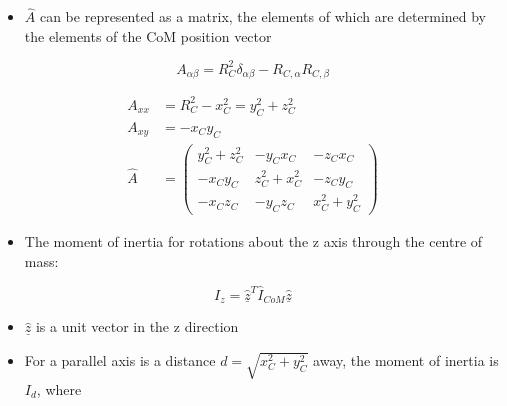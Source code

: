 \documentclass[a4paper,11pt,normalem]{article}
\begin{document}
\begin{itemize}
\item
  \(\hat{A}\) can be represented as a matrix, the elements of which are
  determined by the elements of the CoM position vector
\end{itemize}

\[
    A_{\alpha\beta} = R_C^2\delta_{\alpha\beta} - R_{C,\alpha}R_{C,\beta}
\]

\begin{example}[1]

\[
    \begin{aligned}
    A_{xx} &= R_C^2 - x_C^2 = y_C^2 + z_C^2 \\
    A_{xy} &= -x_Cy_C \\
    \hat{A} &= \begin{pmatrix} y_C^2 + z_C^2 & -y_Cx_C & -z_Cx_C \\ -x_Cy_C & z_C^2 + x_C^2 & -z_Cy_C \\ -x_Cz_C & -y_Cz_C & x_C^2 + y_C^2 \end{pmatrix}
    \end{aligned}
\]

\begin{itemize}
\item
  The moment of inertia for rotations about the z axis through the
  centre of mass:
\end{itemize}

\[
    I_z = \underline{\hat{z}}^T \hat{I}_{CoM} \underline{\hat{z}}
\]

\begin{itemize}
\item
  \(\underline{\hat{z}}\) is a unit vector in the z direction
\item
  For a parallel axis is a distance \(d = \sqrt{x_C^2 + y_C^2}\) away,
  the moment of inertia is \(I_d\), where
\end{itemize}


\end{example}
\end{document}
